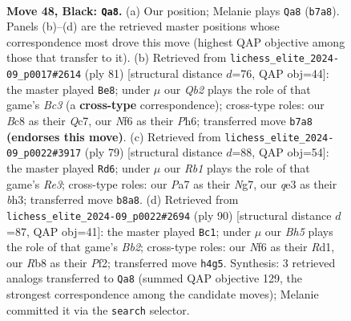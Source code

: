 \documentclass[11pt]{article}
\begin{document}
\begin{figure}[p]
\label{fig:thought-m93}
\end{figure}

\clearpage

\begin{figure}[p]\centering
\begin{subfigure}{0.46\textwidth}\centering
\resizebox{\linewidth}{!}{%
\newchessgame
\chessboard[
  setfen={1rb3k1/pqp2pp1/1p3n2/7p/1P3P1b/B3Q2P/P1B3P1/1R5K b - - 4 48},
  showmover=false,
  pgfstyle=straightmove, color=movearrow, markmove={b7-a8}
]}
\caption{}
\end{subfigure}\hfill
\begin{subfigure}{0.46\textwidth}\centering
\resizebox{\linewidth}{!}{%
\newchessgame
\chessboard[
  setfen={r4b1k/2q3p1/2b2p1p/p3p3/P1P5/2B1P2P/2QN1PP1/R5K1 b - - 10 41},
  showmover=false,
  pgfstyle=straightmove, color=movearrow, markmove={c6-e8}
]}
\caption{}
\end{subfigure}
\\[4pt]
\begin{subfigure}{0.46\textwidth}\centering
\resizebox{\linewidth}{!}{%
\newchessgame
\chessboard[
  setfen={6k1/1pq2pn1/2p1r3/4bp1p/P7/4BQPB/5P2/3R2K1 b - - 2 40},
  showmover=false,
  pgfstyle=straightmove, color=movearrow, markmove={e6-d6}
]}
\caption{}
\end{subfigure}\hfill
\begin{subfigure}{0.46\textwidth}\centering
\resizebox{\linewidth}{!}{%
\newchessgame
\chessboard[
  setfen={b5k1/r1q1bpp1/2p1p2p/1p2P3/3PB2P/1P3QP1/1B3PK1/3R4 w - - 18 46},
  showmover=false,
  pgfstyle=straightmove, color=movearrow, markmove={b2-c1}
]}
\caption{}
\end{subfigure}
\caption{\textbf{Move 48, Black: \texttt{Qa8}.} (a) Our position; Melanie plays \texttt{Qa8} (\texttt{b7a8}). Panels (b)--(d) are the retrieved master positions whose correspondence most drove this move (highest QAP objective among those that transfer to it). (b) Retrieved from \texttt{lichess\_elite\_2024-09\_p0017\#2614} (ply 81) [structural distance $d$=76, QAP obj=44]: the master played \texttt{Be8}; under $\mu$ our \emph{Qb2} plays the role of that game's \emph{Bc3} (a \textbf{cross-type} correspondence); cross-type roles: our \emph{B}c8 as their \emph{Q}c7, our \emph{N}f6 as their \emph{P}h6; transferred move \texttt{b7a8} \textbf{(endorses this move)}. (c) Retrieved from \texttt{lichess\_elite\_2024-09\_p0022\#3917} (ply 79) [structural distance $d$=88, QAP obj=54]: the master played \texttt{Rd6}; under $\mu$ our \emph{Rb1} plays the role of that game's \emph{Re3}; cross-type roles: our \emph{P}a7 as their \emph{N}g7, our \emph{q}e3 as their \emph{b}h3; transferred move \texttt{b8a8}. (d) Retrieved from \texttt{lichess\_elite\_2024-09\_p0022\#2694} (ply 90) [structural distance $d$=87, QAP obj=41]: the master played \texttt{Bc1}; under $\mu$ our \emph{Bh5} plays the role of that game's \emph{Bb2}; cross-type roles: our \emph{N}f6 as their \emph{R}d1, our \emph{R}b8 as their \emph{P}f2; transferred move \texttt{h4g5}. Synthesis: 3 retrieved analogs transferred to \texttt{Qa8} (summed QAP objective 129, the strongest correspondence among the candidate moves); Melanie committed it via the \texttt{search} selector.}

\end{figure}
\end{document}
